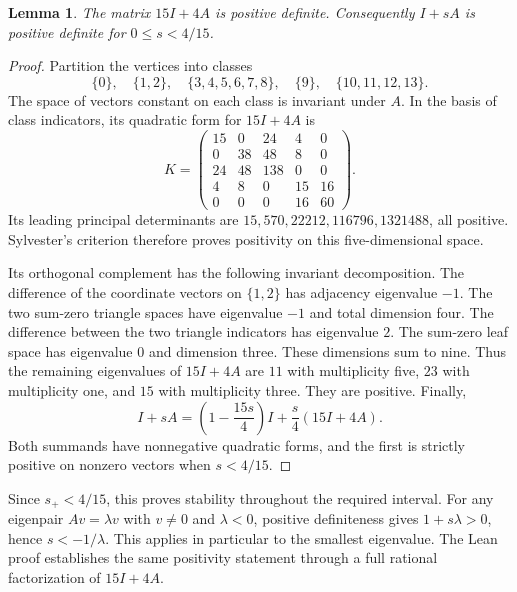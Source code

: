 \documentclass[11pt,a4paper]{article}
\newtheorem{lemma}[theorem]{Lemma}
\begin{document}
\begin{lemma}\label{lem:stability}
The matrix $15I+4A$ is positive definite. Consequently $I+sA$ is
positive definite for $0\leq s<4/15$.
\end{lemma}
\begin{proof}
Partition the vertices into classes
\[
 \{0\},\quad\{1,2\},\quad\{3,4,5,6,7,8\},\quad\{9\},\quad\{10,11,12,13\}.
\]
The space of vectors constant on each class is invariant under $A$.
In the basis of class indicators, its quadratic form for $15I+4A$ is
\[
 K=\begin{pmatrix}
15&0&24&4&0\\
0&38&48&8&0\\
24&48&138&0&0\\
4&8&0&15&16\\
0&0&0&16&60
\end{pmatrix}.
\]
Its leading principal determinants are
$15,570,22212,116796,1321488$, all positive. Sylvester's criterion
therefore proves positivity on this five-dimensional space.

Its orthogonal complement has the following invariant decomposition.
The difference of the coordinate vectors on $\{1,2\}$ has adjacency eigenvalue $-1$.
The two sum-zero triangle spaces have eigenvalue $-1$ and total dimension four.
The difference between the two triangle indicators has eigenvalue $2$.
The sum-zero leaf space has eigenvalue $0$ and dimension three.
These dimensions sum to nine. Thus the remaining eigenvalues of $15I+4A$
are $11$ with multiplicity five, $23$ with multiplicity one, and $15$
with multiplicity three. They are positive.
Finally,
\[
 I+sA=\left(1-\frac{15s}{4}\right)I+\frac{s}{4}(15I+4A).
\]
Both summands have nonnegative quadratic forms, and the first is strictly
positive on nonzero vectors when $s<4/15$.
\end{proof}
Since $s_+<4/15$, this proves stability throughout the required interval.
For any eigenpair $Av=\lambda v$ with $v\ne0$ and $\lambda<0$,
positive definiteness gives $1+s\lambda>0$, hence $s<-1/\lambda$.
This applies in particular to the smallest eigenvalue.
The Lean proof establishes the same positivity statement through a full
rational factorization of $15I+4A$.
\end{document}
